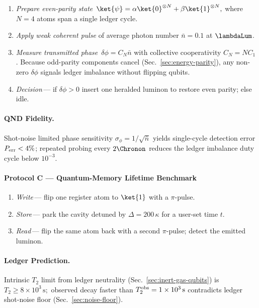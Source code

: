 \documentclass[11pt,oneside]{book}
\begin{document}
{\begin{enumerate}[leftmargin=*,itemsep=3pt]
\item \emph{Prepare even-parity state}\,
      \(
         \ket{\psi}
         = \alpha\ket{0}^{\otimes N}
         + \beta\ket{1}^{\otimes N},
      \)
      where $N=4$ atoms span a single ledger cycle.
\item \emph{Apply weak coherent pulse}
      of average photon number $\bar n\!=\!0.1$ at \(\lambdaLum\).
\item \emph{Measure transmitted phase}\,
      $\delta\phi=C_{N}\bar n$ with collective cooperativity
      \(C_{N}=N C_{1}\).
      Because odd-parity components cancel (Sec.~\ref{sec:energy-parity}),
      any non-zero $\delta\phi$ signals ledger imbalance without
      flipping qubits.
\item \emph{Decision}\,—
      if $\delta\phi>0$ insert one heralded luminon to restore even
      parity; else idle.
\end{enumerate}

\paragraph{QND Fidelity.}
Shot-noise limited phase sensitivity
\(
   \sigma_{\phi}=1/\sqrt{\bar n}
\)
yields single-cycle detection error
\(
   P_{\rm err}<4\%
   \);
      repeated probing every
      \(2\Chronon\)
      reduces the ledger imbalance duty cycle below $10^{-3}$.

\paragraph{Protocol C — Quantum-Memory Lifetime Benchmark}

\begin{enumerate}[leftmargin=*,itemsep=3pt]
\item \emph{Write}\,—
      flip one register atom to $\ket{1}$ with a $\pi$-pulse.
\item \emph{Store}\,—
      park the cavity detuned by
      \(\Delta=200\,\kappa\)
      for a user-set time $t$.
\item \emph{Read}\,—
      flip the same atom back with a second $\pi$-pulse;
      detect the emitted luminon.
\end{enumerate}

\paragraph{Ledger Prediction.}
Intrinsic $T_{2}$ limit from ledger neutrality
(Sec.~\ref{sec:inert-gas-qubits})
is
\(
   T_{2}\ge8\times10^{3}\,\text{s};
\)
observed decay faster than
\(T_{2}^{\rm obs}=1\times10^{3}\,\text{s}\)
contradicts ledger shot-noise floor
(Sec.~\ref{sec:noise-floor}).

}
\end{document}
